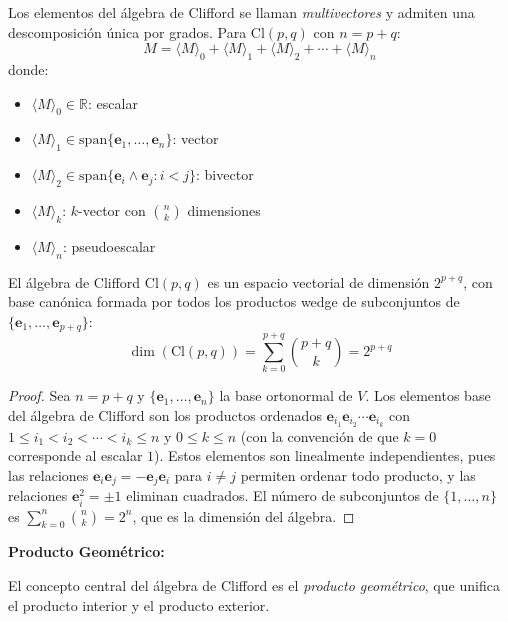 \begin{definition}\label{def:multivector_cnn}
Los elementos del álgebra de Clifford se llaman \textit{multivectores} y admiten una descomposición única por grados. Para $\text{Cl}(p,q)$ con $n = p+q$:
\[M = \langle M \rangle_0 + \langle M \rangle_1 + \langle M \rangle_2 + \cdots + \langle M \rangle_n\]
donde:
\begin{itemize}
    \item $\langle M \rangle_0 \in \mathbb{R}$: escalar
    \item $\langle M \rangle_1 \in \text{span}\{\mathbf{e}_1, \ldots, \mathbf{e}_n\}$: vector
    \item $\langle M \rangle_2 \in \text{span}\{\mathbf{e}_i \wedge \mathbf{e}_j : i < j\}$: bivector
    \item $\langle M \rangle_k$: $k$-vector con $\binom{n}{k}$ dimensiones
    \item $\langle M \rangle_n$: pseudoescalar
\end{itemize}
\end{definition}

\begin{theorem}\label{thm:dim_clifford_cnn}
El álgebra de Clifford $\text{Cl}(p,q)$ es un espacio vectorial de dimensión $2^{p+q}$, con base canónica formada por todos los productos wedge de subconjuntos de $\{\mathbf{e}_1, \ldots, \mathbf{e}_{p+q}\}$:
\[\dim(\text{Cl}(p,q)) = \sum_{k=0}^{p+q} \binom{p+q}{k} = 2^{p+q}\]
\end{theorem}

\begin{proof}
Sea $n = p + q$ y $\{\mathbf{e}_1, \ldots, \mathbf{e}_n\}$ la base ortonormal de $V$. Los elementos base del álgebra de Clifford son los productos ordenados $\mathbf{e}_{i_1} \mathbf{e}_{i_2} \cdots \mathbf{e}_{i_k}$ con $1 \leq i_1 < i_2 < \cdots < i_k \leq n$ y $0 \leq k \leq n$ (con la convención de que $k = 0$ corresponde al escalar $1$). Estos elementos son linealmente independientes, pues las relaciones $\mathbf{e}_i \mathbf{e}_j = -\mathbf{e}_j \mathbf{e}_i$ para $i \neq j$ permiten ordenar todo producto, y las relaciones $\mathbf{e}_i^2 = \pm 1$ eliminan cuadrados. El número de subconjuntos de $\{1, \ldots, n\}$ es $\sum_{k=0}^{n} \binom{n}{k} = 2^n$, que es la dimensión del álgebra.
\end{proof}

\textbf{Producto Geométrico:}

El concepto central del álgebra de Clifford es el \textit{producto geométrico}, que unifica el producto interior y el producto exterior.

